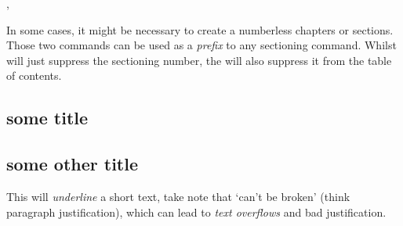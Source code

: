 \documentclass[article,nofontwarning,nogeometry,english,tocdepth=3,secdepth=3]{ufrgscca} %
\begin{document}
\begin{codedescribe}{\nonum,\notoc}
	\begin{codesyntax}%
	\end{codesyntax}
In some cases, it might be necessary to create a numberless chapters or sections. Those two commands can be used as a \emph{prefix} to any sectioning command. Whilst \tsmacro{\nonum}{} will just suppress the sectioning number, the \tsmacro{\notoc}{} will also suppress it from the table of contents.
\end{codedescribe}

\begin{codestore}[st=demononum]
	\nonum\chapter{some title} %
	\notoc\section{some other title} %
\end{codestore}

\begin{codedescribe}{\tightul}
	\begin{codesyntax}%
		\tsmacro{\tightul}{text}
	\end{codesyntax}
This will \emph{underline} a short text, take note that  `can't be broken' (think paragraph justification), which can lead to \emph{text overflows} and bad justification.
\end{codedescribe}
\end{document}
